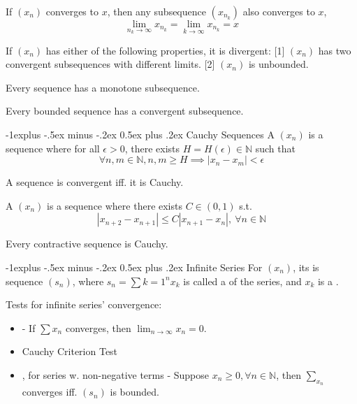 \documentclass[10pt,landscape,letterpaper]{article}
\makeatletter
\renewcommand{\subsection}{\@startsection{subsection}{2}{0mm}%
                                {-1explus -.5ex minus -.2ex}%
                                {0.5ex plus .2ex}%
                                {\sffamily\normalsize\itshape}}
\makeatother
\begin{document}
\begin{multicols}{3}
 If $(x_n)$ converges to $x$, then any subsequence $(x_{n_k})$ also converges to $x$, 
\[
\lim_{n_k \to \infty} x_{n_k} = \lim_{k \to \infty} x_{n_k} = x
\]


 If $(x_n)$ has either of the following properties, it is divergent: [1] $(x_n)$ has two convergent subsequences with different limits. [2] $(x_n)$ is unbounded.


 Every sequence has a monotone subsequence.


 Every bounded sequence has a convergent subsequence.




\subsection{Cauchy Sequences}
A  $(x_n)$ is a sequence where for all $\epsilon > 0$, there exists $H = H(\epsilon) \in \mathbb{N}$ such that
\[
\forall n, m \in \mathbb{N}, n, m \ge H \implies |x_n - x_m| < \epsilon
\]

 A sequence is convergent iff. it is Cauchy.


\smallbreak


A  $(x_n)$ is a sequence where there exists $C \in (0, 1)$ s.t. 
\[
|x_{n+2} - x_{n+1}| \le C |x_{n+1} - x_n|, \ \forall n \in \mathbb{N}
\]


 Every contractive sequence is Cauchy.




\subsection{Infinite Series}
For $(x_n)$, its  is sequence $(s_n)$, where $s_n = \sum{k=1}^n x_k$ is called a  of the series, and $x_k$ is a .

Tests for infinite series' convergence:
\begin{itemize}
    \item {} - If $\sum x_n$ converges, then $\lim_{n\to\infty} x_n = 0$.
    
    \item Cauchy Criterion Test
    
    \item {}, for series w. non-negative terms - Suppose $x_n \ge 0, \forall n \in \mathbb{N}$, then $\sum_{x_n}$ converges iff. $(s_n)$ is bounded.
    

\end{itemize}
\end{multicols}
\end{document}
